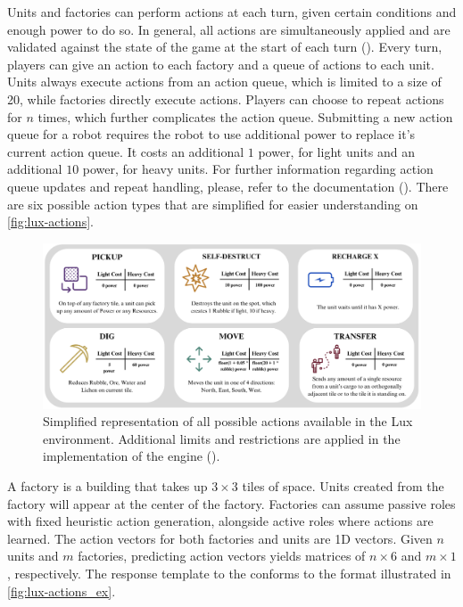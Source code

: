         \noindent Units and factories can perform actions at each turn, given certain conditions and enough power to do so. In general, all actions are simultaneously applied and are validated against the state of the game at the start of each turn (\cite{chen2023emergent}). Every turn, players can give an action to each factory and a queue of actions to each unit. Units always execute actions from an action queue, which is limited to a size of 20, while factories directly execute actions. Players can choose to repeat actions for $n$ times, which further complicates the action queue. Submitting a new action queue for a robot requires the robot to use additional power to replace it's current action queue. It costs an additional $1$ power, for light units and an additional $10$ power, for heavy units. For further information regarding action queue updates and repeat handling, please, refer to the documentation (\textcolor{deepblue}{\cite{lux-ai-season-2}}). There are six possible action types that are simplified for easier understanding on \textcolor{deepblue}{\autoref{fig:lux-actions}}.
        
        \bigskip
        
        \begin{figure}[htbp]
            \centering
            \includegraphics[width=1\linewidth]{images/intro_luxenv/action/action_space.png}
            \captionsetup{justification=justified, singlelinecheck=false, width=1\linewidth, labelfont=bf} 
            \caption{Simplified representation of all possible actions available in the Lux environment. Additional limits and restrictions are applied in the implementation of the engine (\textcolor{deepblue}{\cite{lux-ai-season-2}}).}
            \label{fig:lux-actions}
        \end{figure}
        
        \noindent A factory is a building that takes up $3\times3$ tiles of space. Units created from the factory will appear at the center of the factory. Factories can assume passive roles with fixed heuristic action generation, alongside active roles where actions are learned. The action vectors for both factories and units are 1D vectors. Given $n$ units and $m$ factories, predicting action vectors yields matrices of $n\times6$ and $m\times1$, respectively. The response template to the  conforms to the format illustrated in \textcolor{deepblue}{\autoref{fig:lux-actions_ex}}.
        
